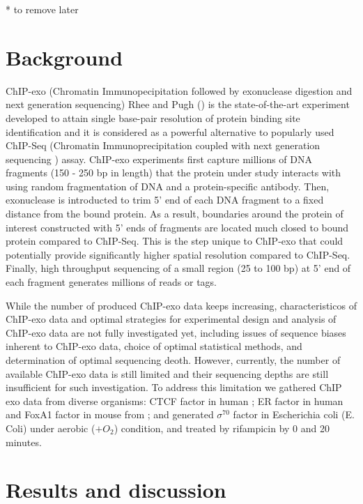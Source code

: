 \documentclass{bmcart}\usepackage[]{graphicx}\usepackage[]{color}
\begin{document}
\newpage

* to remove later

\tableofcontents




\newpage


\section{Background}
\label{sec:intro}

ChIP-exo (Chromatin Immunopecipitation followed by exonuclease
digestion and next generation sequencing) Rhee and Pugh (\cite{exo1})
is the state-of-the-art experiment developed to attain single
base-pair resolution of protein binding site identification and it is
considered as a powerful alternative to popularly used ChIP-Seq
(Chromatin Immunoprecipitation coupled with next generation sequencing
) assay. ChIP-exo experiments first capture millions of DNA fragments
(150 - 250 bp in length) that the protein under study interacts with
using random fragmentation of DNA and a protein-specific
antibody. Then, exonuclease is introducted to trim 5' end of each DNA
fragment to a fixed distance from the bound protein. As a result,
boundaries around the protein of interest constructed with 5' ends of
fragments are located much closed to bound protein compared to
ChIP-Seq. This is the step unique to ChIP-exo that could potentially
provide significantly higher spatial resolution compared to
ChIP-Seq. Finally, high throughput sequencing of a small region (25 to
100 bp) at 5' end of each fragment generates millions of reads or
tags.

While the number of produced ChIP-exo data keeps increasing,
characteristicos of ChIP-exo data and optimal strategies for
experimental design and analysis of ChIP-exo data are not fully
investigated yet, including issues of sequence biases inherent to
ChIP-exo data, choice of optimal statistical methods, and
determination of optimal sequencing deoth. However, currently, the
number of available ChIP-exo data is still limited and their
sequencing depths are still insufficient for such investigation. To
address this limitation we gathered ChIP exo data from diverse
organisms: CTCF factor in human \cite{exo1}; ER factor in human and
FoxA1 factor in mouse from \cite{exo_illumnina}; and generated
$\sigma^{70}$ factor in Escherichia coli (E. Coli) under aerobic ($ +
O_2$) condition, and treated by rifampicin by 0 and 20 minutes.



\section{Results and discussion}
\label{sec:results}
\end{document}
